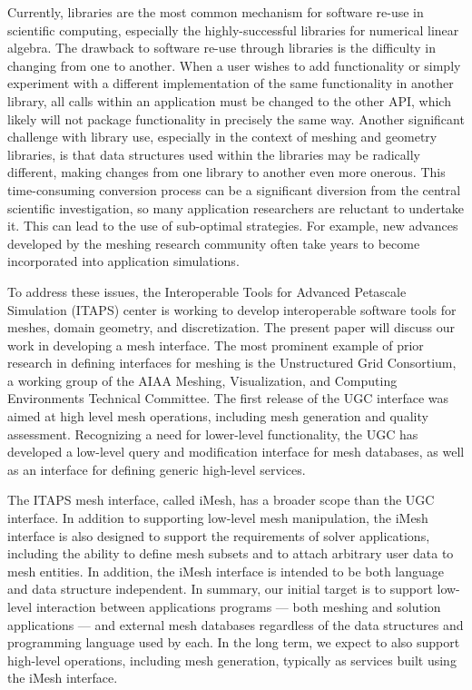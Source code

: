 Currently, libraries are the most common mechanism for software re-use
in scientific computing, especially the highly-successful libraries for
numerical linear algebra\cite{petsc,BaGr97,eispack,lapack,linpack}.
The drawback to software re-use through libraries is the difficulty in
changing from one to another. When a user wishes to add functionality or
simply experiment with a different implementation of the same
functionality in another library, all calls within an application must
be changed to the other API, which likely will not package functionality
in precisely the same way. Another significant challenge with library
use, especially in the context of meshing and geometry libraries, is
that data structures used within the libraries may be radically
different, making changes from one library to another even more onerous.
This time-consuming conversion process can be a significant diversion
from the central scientific investigation, so many application
researchers are reluctant to undertake it. This can lead to the use of
sub-optimal strategies.  For example, new advances developed by the
meshing research community often take years to become incorporated into
application simulations.

To address these issues, the Interoperable Tools for Advanced Petascale
Simulation (ITAPS) center is working to develop interoperable software
tools for meshes, domain geometry, and
discretization\cite{tstt:overview}.  The present paper will discuss our
work in developing a mesh interface.  The most prominent example of
prior research in defining interfaces for meshing is the Unstructured
Grid Consortium, a working group of the AIAA Meshing, Visualization, and
Computing Environments Technical Committee\cite{UGC-web}.  The first
release of the UGC interface\cite{UGC-v1} was aimed at high level mesh
operations, including mesh generation and quality assessment.
Recognizing a need for lower-level functionality, the UGC has developed
a low-level query and modification interface for mesh databases, as well
as an interface for defining generic high-level
services\cite{UGC-v2:paper}.

The ITAPS mesh interface, called iMesh, has a broader scope than the UGC
interface.  In addition to supporting low-level mesh manipulation, the
iMesh interface is also designed to support the requirements of solver
applications, including the ability to define mesh subsets and to attach
arbitrary user data to mesh entities.  In addition, the iMesh interface
is intended to be both language and data structure independent.  In
summary, our initial target is to support low-level interaction between
applications programs --- both meshing and solution applications --- and
external mesh databases regardless of the data structures and
programming language used by each.  In the long term, we expect to also
support high-level operations, including mesh generation, typically as
services built using the iMesh interface.

